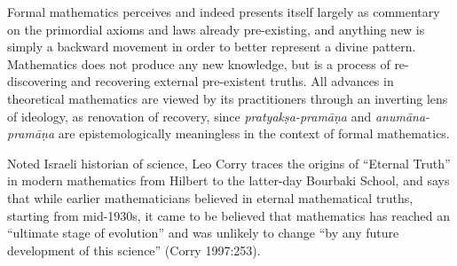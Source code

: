 Formal mathematics perceives and indeed presents itself largely as commentary on the primordial axioms and laws already pre-existing, and anything new is simply a backward movement in order to better represent a divine pattern. Mathematics does not produce any new knowledge, but is a process of re-discovering and recovering external pre-existent truths. All advances in theoretical mathematics are viewed by its practitioners through an inverting lens of ideology, as renovation of recovery, since {\sl pratyakṣa-pramāṇa} and {\sl anumāna-pramāṇa} are epistemologically meaningless in the context of formal mathematics. 

Noted Israeli historian of science, Leo Corry traces the origins of ``Eternal Truth'' in modern mathematics from Hilbert to the latter-day Bourbaki School, and says that while earlier mathematicians believed in eternal mathematical truths, starting from mid-1930s, it came to be believed that mathematics has reached an “ultimate stage of evolution” and was unlikely to change “by any future development of this science” (Corry 1997:253).

\newpage

